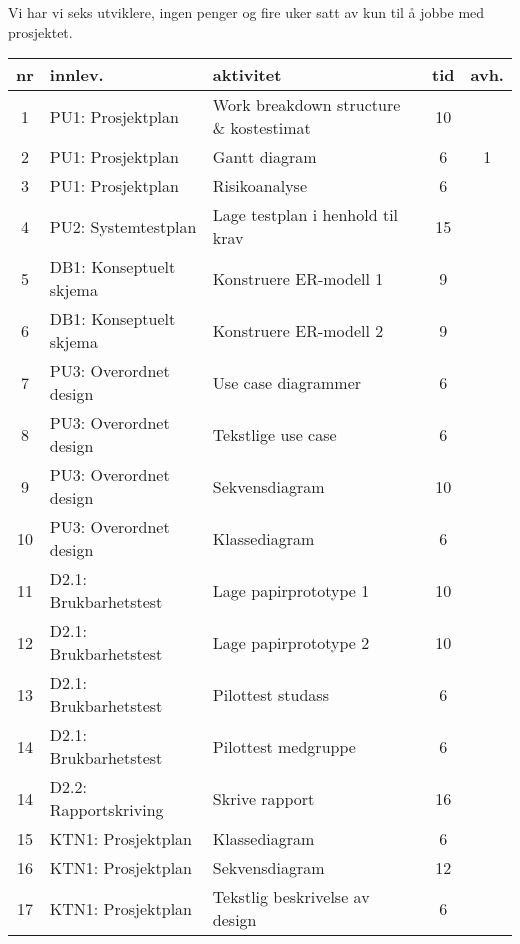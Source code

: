 
Vi har vi seks utviklere, ingen penger og fire uker satt av kun til å jobbe med prosjektet.

\begin{table}
    \centering
	\begin{tabularx}{1.3\textwidth}{|c|l|X|c|c|}
	\hline
	\textbf{nr}& \textbf{innlev.}& \textbf{aktivitet}& \textbf{tid}& \textbf{avh.}\\ \hline
	1 & PU1: Prosjektplan & Work breakdown structure \& kostestimat & 10 & \\ \hline
	2 & PU1: Prosjektplan  & Gantt diagram & 6 & 1 \\ \hline
	3 & PU1: Prosjektplan  & Risikoanalyse & 6 & \\ \hline
	4 & PU2: Systemtestplan & Lage testplan i henhold til krav & 15 & \\ \hline
	5 & DB1: Konseptuelt skjema & Konstruere ER-modell 1 & 9 & \\ \hline
	6 & DB1: Konseptuelt skjema & Konstruere ER-modell 2 & 9 & \\ \hline
	7 & PU3: Overordnet design & Use case diagrammer & 6 & \\ \hline
	8 & PU3: Overordnet design  & Tekstlige use case & 6 & \\ \hline
	9 & PU3: Overordnet design  & Sekvensdiagram & 10 & \\ \hline
	10 & PU3: Overordnet design  & Klassediagram & 6 & \\ \hline
	11 & D2.1: Brukbarhetstest & Lage papirprototype 1& 10 & \\ \hline
	12 & D2.1: Brukbarhetstest & Lage papirprototype 2& 10 & \\ \hline
	13 & D2.1: Brukbarhetstest & Pilottest studass & 6 & \\ \hline
	14 & D2.1: Brukbarhetstest & Pilottest medgruppe & 6 & \\ \hline
	14 & D2.2: Rapportskriving & Skrive rapport & 16 & \\ \hline
	15 & KTN1: Prosjektplan & Klassediagram & 6 & \\ \hline
	16 & KTN1: Prosjektplan & Sekvensdiagram & 12 & \\ \hline
	17 & KTN1: Prosjektplan & Tekstlig beskrivelse av design & 6 & \\ \hline

\end{tabularx}
\end{table}
